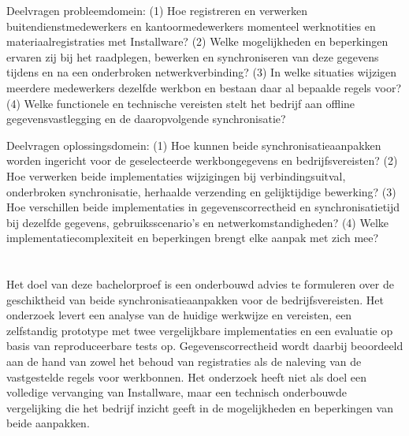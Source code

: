 Deelvragen probleemdomein:
(1) Hoe registreren en verwerken buitendienstmedewerkers en kantoormedewerkers momenteel werknotities en materiaalregistraties met Installware?
(2) Welke mogelijkheden en beperkingen ervaren zij bij het raadplegen, bewerken en synchroniseren van deze gegevens tijdens en na een onderbroken netwerkverbinding?
(3) In welke situaties wijzigen meerdere medewerkers dezelfde werkbon en bestaan daar al bepaalde regels voor?
(4) Welke functionele en technische vereisten stelt het bedrijf aan offline gegevensvastlegging en de daaropvolgende synchronisatie?

Deelvragen oplossingsdomein:
(1) Hoe kunnen beide synchronisatieaanpakken worden ingericht voor de geselecteerde werkbongegevens en bedrijfsvereisten?
(2) Hoe verwerken beide implementaties wijzigingen bij verbindingsuitval, onderbroken synchronisatie, herhaalde verzending en gelijktijdige bewerking?
(3) Hoe verschillen beide implementaties in gegevenscorrectheid en synchronisatietijd bij dezelfde gegevens, gebruiksscenario’s en netwerkomstandigheden?
(4) Welke implementatiecomplexiteit en beperkingen brengt elke aanpak met zich mee?

\section{}%
\label{sec:onderzoeksdoelstelling}

Het doel van deze bachelorproef is een onderbouwd advies te formuleren over de geschiktheid van beide synchronisatieaanpakken
voor de bedrijfsvereisten. Het onderzoek levert een analyse van de huidige werkwijze en vereisten, een zelfstandig prototype met
twee vergelijkbare implementaties en een evaluatie op basis van reproduceerbare tests op.
Gegevenscorrectheid wordt daarbij beoordeeld aan de hand van zowel het behoud van registraties als de naleving
van de vastgestelde regels voor werkbonnen. Het onderzoek heeft niet als doel een volledige vervanging van Installware,
maar een technisch onderbouwde vergelijking die het bedrijf inzicht geeft in de mogelijkheden en beperkingen van beide aanpakken.

\section{}%
\label{sec:opzet-bachelorproef}


